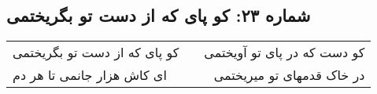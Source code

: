 \begin{center}
\section*{شماره ۲۳: کو پای که از دست تو بگریختمی}
\label{sec:023}
\begin{longtable}{l p{0.5cm} r}
کو پای که از دست تو بگریختمی
&&
کو دست که در پای تو آویختمی
\\
ای کاش هزار جانمی تا هر دم
&&
در خاک قدمهای تو میریختمی
\\
\end{longtable}
\end{center}
